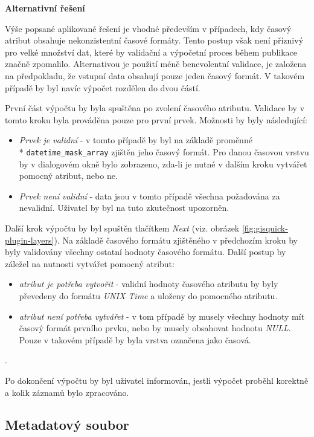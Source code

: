 \bigskip
\noindent
\textbf{Alternativní řešení}

Výše popsané aplikované řešení je vhodné především v případech, kdy časový
atribut obsahuje nekonzistentní časové formáty. Tento postup však není 
příznivý pro velké množství dat, které by validační a výpočetní proces 
během publikace značně zpomalilo. Alternativou je použití méně benevolentní 
validace, je založena na předpokladu, že vstupní data obsahují pouze jeden časový 
formát. V takovém případě by byl navíc výpočet rozdělen do dvou částí. 

První část výpočtu by byla spuštěna po zvolení časového atributu. Validace by 
v tomto kroku byla prováděna pouze pro první prvek. Možnosti by byly následující:

\begin{itemize}
	\item\textit{Prvek je validní} - v tomto případě by byl na základě proměnné
	\\* \verb|datetime_mask_array| zjištěn jeho časový formát. Pro danou časovou 
	vrstvu by v dialogovém okně bylo zobrazeno, zda-li je nutné v dalším 
	kroku vytvářet pomocný atribut, nebo ne.
	\item\textit{Prvek není validní} - data jsou v tomto případě všechna 
	požadována za nevalidní. Uživatel by byl na tuto zkutečnost upozorněn.
\end{itemize}

Další krok výpočtu by byl spuštěn tlačítkem \textit{Next} (viz. obrázek 
\ref{fig:gisquick-plugin-layers}). Na základě časového formátu zjištěného
v předchozím kroku by byly validovány všechny ostatní hodnoty časového 
formátu. Další postup by záležel na nutnosti vytvářet pomocný atribut:

\begin{itemize}
	\item\textit{atribut je potřeba vytvořit} - validní hodnoty časového 
	atributu by byly převedeny do formátu \textit{UNIX Time} a uloženy do 
	pomocného atributu.
	\item\textit{atribut není potřeba vytvářet} - v tom případě by musely 
	všechny hodnoty mít časový formát prvního prvku, nebo by musely 
	obsahovat hodnotu \textit{NULL}. Pouze v takovém případě by byla 
	vrstva označena jako časová.
\end{itemize}.

Po dokončení výpočtu by byl uživatel informován, jestli výpočet proběhl
korektně a kolik záznamů bylo zpracováno.	

\subsection{Metadatový soubor}
\label{sssec:metadata}

